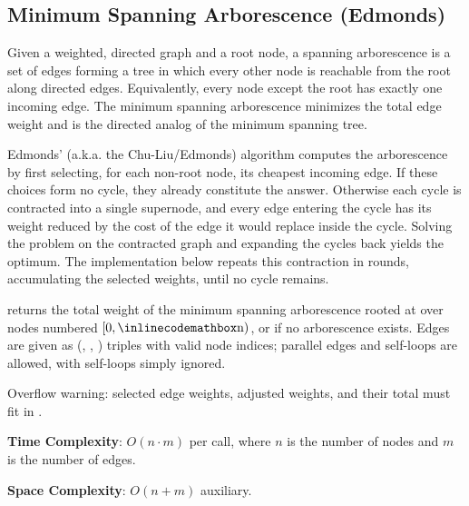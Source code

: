\subsection{Minimum Spanning Arborescence (Edmonds)}
\label{sec:4.4.5}
Given a weighted, directed graph and a root node, a spanning arborescence is a set of edges forming a tree in which every other node is reachable from the root along directed edges. Equivalently, every node except the root has exactly one incoming edge. The minimum spanning arborescence minimizes the total edge weight and is the directed analog of the minimum spanning tree.

Edmonds' (a.k.a. the Chu-Liu/Edmonds) algorithm computes the arborescence by first selecting, for each non-root node, its cheapest incoming edge. If these choices form no cycle, they already constitute the answer. Otherwise each cycle is contracted into a single supernode, and every edge entering the cycle has its weight reduced by the cost of the edge it would replace inside the cycle. Solving the problem on the contracted graph and expanding the cycles back yields the optimum. The implementation below repeats this contraction in rounds, accumulating the selected weights, until no cycle remains.

\begin{compactitem}
  \item {} returns the total weight of the minimum spanning arborescence rooted at  over  nodes numbered $[0, {\inlinecodemath{n}})$, or  if no arborescence exists. Edges are given as (, , ) triples with valid node indices; parallel edges and self-loops are allowed, with self-loops simply ignored.
\end{compactitem}

Overflow warning: selected edge weights, adjusted weights, and their total must fit in .

\textbf{Time Complexity}: $O(n \cdot m)$ per call, where $n$ is the number of nodes and $m$ is the number of edges.

\textbf{Space Complexity}: $O(n + m)$ auxiliary.

